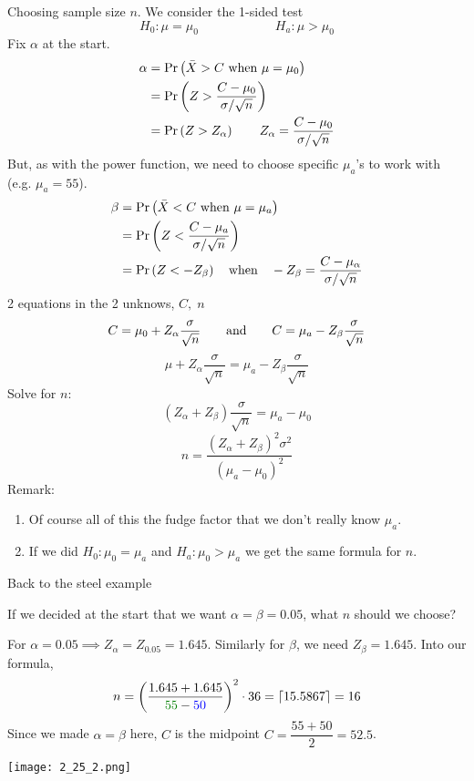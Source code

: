 \disc Choosing sample size $n$. We consider the 1-sided test
$$H_0 : \mu = \mu_0 \hspace{1in} H_a : \mu > \mu_0$$
Fix $\alpha$ at the start.
\begin{align*}
    \alpha &= \P{\Xbar > C \text{ when } \mu = \mu_0}\\
    &= \P{Z > \frac{C-\mu_0}{\sigma / \sqrt{n}}}\\
    &= \P{Z > Z_{\alpha}} \qquad Z_{\alpha} = \frac{C-\mu_0}{\sigma/\sqrt{n}}
\end{align*}
But, as with the power function, we need to choose specific $\mu_a$'s to work with (e.g. $\mu_a = 55$).
\begin{align*}
    \beta &= \P{\Xbar < C \text{ when } \mu = \mu_a}\\
    &= \P{Z < \frac{C-\mu_a}{\sigma / \sqrt{n}}}\\%
    &= \P{Z < -Z_{\beta}} \quad \text{when}\quad -Z_{\beta} = \frac{C-\mu_{\alpha}}{\sigma/\sqrt{n}}
\end{align*}
2 equations in the 2 unknows, $C,\;n$
$$C = \mu_0 + Z_{\alpha} \frac{\sigma}{\sqrt{n}} \qquad \text{and} \qquad C = \mu_a - Z_{\beta} \frac{\sigma}{\sqrt{n}}$$
$$\mu + Z_{\alpha} \frac{\sigma}{\sqrt{n}} = \mu_a - Z_{\beta} \frac{\sigma}{\sqrt{n}} $$
Solve for $n$: 
$$(Z_{\alpha} + Z_{\beta})\frac{\sigma}{\sqrt{n}} = \mu_a - \mu_0$$
$$n = \frac{(Z_{\alpha} + Z_{\beta})^2 \sigma^2}{(\mu_a-\mu_0)^2}$$
Remark:
\begin{enumerate}[label=\textcircled{\raisebox{-1pt}{\arabic*}}]
    \item Of course all of this the fudge factor that we don't really know $\mu_a$.
    \item If we did $H_0 : \mu_0 = \mu_a$ and $H_a : \mu_0 > \mu_a$ we get the same formula for $n$. 
\end{enumerate}

\example* Back to the steel example

\nl If we decided at the start that we want $\alpha = \beta = 0.05$, what $n$ should we choose?

\nl For $\alpha = 0.05 \implies Z_{\alpha} = Z_{0.05} = 1.645$. Similarly for $\beta$, we need $Z_{\beta} = 1.645.$
Into our formula,
$$n = \pars{\frac{1.645+1.645}{\color{ggreen}55 \color{black} - \color{blue}50 \color{black}}}^2 \cdot 36 = \lceil 15.5867 \rceil = 16$$
Since we made $\alpha = \beta$ here, $C$ is the midpoint $C = \dfrac{55+50}{2} = 52.5$.
\begin{center}\texttt{[image: 2\_25\_2.png]}\end{center}